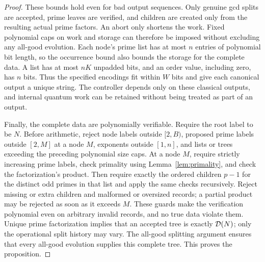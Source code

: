 \begin{proof}
These bounds hold even for bad output sequences.  Only genuine gcd
splits are accepted, prime leaves are verified, and children are created
only from the resulting actual prime factors.  An abort only shortens
the work.  Fixed polynomial caps on work and storage can therefore be
imposed without excluding any all-good evolution.  Each node's prime
list has at most $n$ entries of polynomial bit length, so the occurrence
bound also bounds the storage for the complete data.  A list has at most
$nK$ unpadded bits, and an order value, including zero, has $n$ bits.
Thus the specified encodings fit within $W$ bits and give each canonical
output a unique string.
The controller depends only on these classical outputs, and internal
quantum work can be retained without being treated as part of an output.

Finally, the complete data are polynomially verifiable.  Require the root
label to be $N$. Before arithmetic, reject node labels outside $[2,B)$,
proposed prime labels outside $[2,M]$ at a node $M$, exponents outside
$[1,n]$, and lists or trees exceeding the preceding polynomial size caps.
At a node $M$, require strictly increasing prime labels, check primality
using Lemma~\ref{lem:primality}, and check the factorization's product.
Then require exactly the ordered children $p-1$ for the distinct odd primes
in that list and apply the same
checks recursively.  Reject missing or extra children and malformed or
oversized records; a partial product may be rejected as soon as it exceeds
$M$. These guards make the verification polynomial even on arbitrary
invalid records, and no true data violate them.
Unique prime factorization implies that an accepted tree is exactly
$\mathcal D(N)$; only the operational split history may vary.  The all-good
splitting argument ensures that every all-good evolution supplies this
complete tree.  This proves the proposition.
\end{proof}
